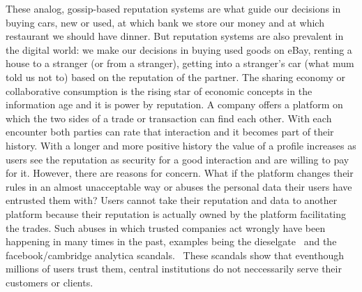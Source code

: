 
These analog, gossip-based reputation systems are what guide our decisions in buying cars, new or 
used, at which bank we store our money and at which restaurant we should have dinner.
But reputation systems are also prevalent in the digital world: we make our decisions in buying used goods 
on eBay, renting a house to a stranger (or from a stranger), getting into a stranger's car 
(what mum told us not to) based on the reputation of the partner. The sharing economy or collaborative consumption is the 
rising star of economic concepts in the information age and it is power by reputation. A company 
offers a platform on which the two sides of a trade or transaction can find each other. With each 
encounter both parties can rate that interaction and it becomes part of their history. With a longer
and more positive history the value of a profile increases as users see the reputation as security
for a good interaction and are willing to pay for it. However, there are reasons for concern. What
if the platform changes their rules in an almost unacceptable way or abuses the personal data their
users have entrusted them with? Users cannot take their reputation and data to another platform
because their reputation is actually owned by the platform facilitating the trades. Such abuses
in which trusted companies act wrongly have been happening in many times in the past, examples being
the dieselgate~\cite{VWDiesel} and the facebook/cambridge analytica scandals.~\cite{facebook} These
scandals show that eventhough millions of users trust them, central institutions do not neccessarily
serve their customers or clients. 


